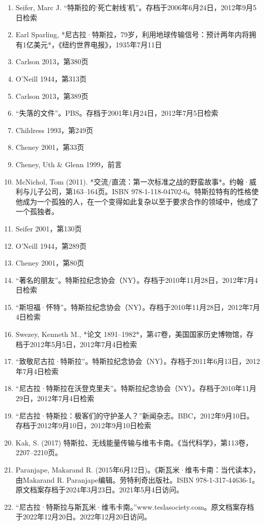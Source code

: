 \begin{enumerate}
\item Seifer, Marc J. “特斯拉的‘死亡射线’机”。存档于2006年6月24日，2012年9月5日检索  
\item Earl Sparling, *尼古拉·特斯拉，79岁，利用地球传输信号：预计两年内将拥有1亿美元*，《纽约世界电报》，1935年7月11日  
\item Carlson 2013，第380页  
\item O'Neill 1944，第313页  
\item Carlson 2013，第389页  
\item “失落的文件”。PBS。存档于2001年1月24日，2012年7月5日检索  
\item Childress 1993，第249页  
\item Cheney 2001，第33页  
\item Cheney, Uth & Glenn 1999，前言  
\item McNichol, Tom (2011). *交流/直流：第一次标准之战的野蛮故事*。约翰·威利与儿子公司，第163–164页。ISBN 978-1-118-04702-6。特斯拉特有的性格使他成为一个孤独的人，在一个变得如此复杂以至于要求合作的领域中，他成了一个孤独者。
\item Seifer 2001，第130页  
\item O'Neill 1944，第289页  
\item Cheney 2001，第80页  
\item “著名的朋友”。特斯拉纪念协会（NY）。存档于2010年11月28日，2012年7月4日检索  
\item “斯坦福·怀特”。特斯拉纪念协会（NY）。存档于2010年11月28日，2012年7月4日检索  
\item Swezey, Kenneth M., *论文 1891–1982*，第47卷，美国国家历史博物馆，存档于2012年5月5日，2012年7月4日检索  
\item “致敬尼古拉·特斯拉”。特斯拉纪念协会（NY）。存档于2011年6月13日，2012年7月4日检索  
\item “尼古拉·特斯拉在沃登克里夫”。特斯拉纪念协会（NY）。存档于2010年11月29日，2012年7月4日检索  
\item “尼古拉·特斯拉：极客们的守护圣人？”新闻杂志。BBC，2012年9月10日。存档于2012年9月10日，2012年9月10日检索
\item Kak, S. (2017) 特斯拉、无线能量传输与维韦卡南。《当代科学》，第113卷，2207–2210页。
\item Paranjape, Makarand R. (2015年6月12日)。《斯瓦米·维韦卡南：当代读本》，由Makarand R. Paranjape编辑。劳特利奇出版社。ISBN 978-1-317-44636-1。原文档案存档于2024年3月23日。2021年5月4日访问。
\item “尼古拉·特斯拉与斯瓦米·维韦卡南。”www.teslasociety.com。原文档案存档于2022年12月20日。2022年12月20日访问。

\end{enumerate}
